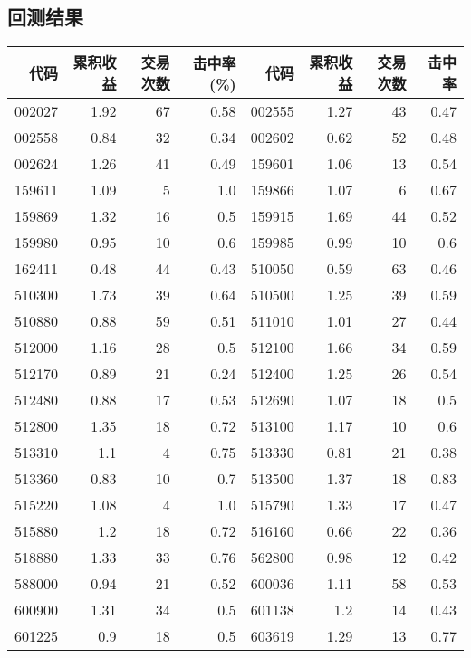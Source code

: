 \subsection*{回测结果}
\begin{table}
    \centering
    \begin{tabular}{rrrrrrrr}
        \hline
        代码     & 累积收益 & 交易次数 & 击中率(\%) & 代码     & 累积收益 & 交易次数 & 击中率  \\
        \hline
        002027 & 1.92 & 67   & 0.58    & 002555 & 1.27 & 43   & 0.47 \\
        002558 & 0.84 & 32   & 0.34    & 002602 & 0.62 & 52   & 0.48 \\
        002624 & 1.26 & 41   & 0.49    & 159601 & 1.06 & 13   & 0.54 \\
        159611 & 1.09 & 5    & 1.0     & 159866 & 1.07 & 6    & 0.67 \\
        159869 & 1.32 & 16   & 0.5     & 159915 & 1.69 & 44   & 0.52 \\
        159980 & 0.95 & 10   & 0.6     & 159985 & 0.99 & 10   & 0.6  \\
        162411 & 0.48 & 44   & 0.43    & 510050 & 0.59 & 63   & 0.46 \\
        510300 & 1.73 & 39   & 0.64    & 510500 & 1.25 & 39   & 0.59 \\
        510880 & 0.88 & 59   & 0.51    & 511010 & 1.01 & 27   & 0.44 \\
        512000 & 1.16 & 28   & 0.5     & 512100 & 1.66 & 34   & 0.59 \\
        512170 & 0.89 & 21   & 0.24    & 512400 & 1.25 & 26   & 0.54 \\
        512480 & 0.88 & 17   & 0.53    & 512690 & 1.07 & 18   & 0.5  \\
        512800 & 1.35 & 18   & 0.72    & 513100 & 1.17 & 10   & 0.6  \\
        513310 & 1.1  & 4    & 0.75    & 513330 & 0.81 & 21   & 0.38 \\
        513360 & 0.83 & 10   & 0.7     & 513500 & 1.37 & 18   & 0.83 \\
        515220 & 1.08 & 4    & 1.0     & 515790 & 1.33 & 17   & 0.47 \\
        515880 & 1.2  & 18   & 0.72    & 516160 & 0.66 & 22   & 0.36 \\
        518880 & 1.33 & 33   & 0.76    & 562800 & 0.98 & 12   & 0.42 \\
        588000 & 0.94 & 21   & 0.52    & 600036 & 1.11 & 58   & 0.53 \\
        600900 & 1.31 & 34   & 0.5     & 601138 & 1.2  & 14   & 0.43 \\
        601225 & 0.9  & 18   & 0.5     & 603619 & 1.29 & 13   & 0.77 \\
        \hline
    \end{tabular}
\end{table}